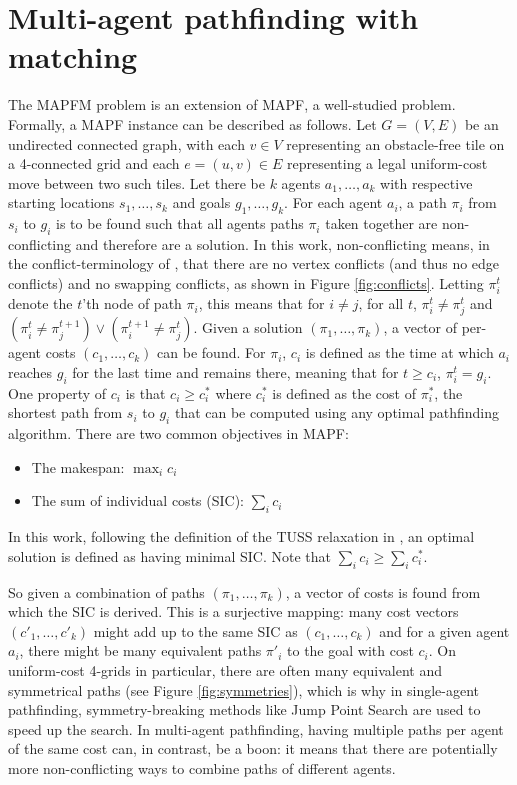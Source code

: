\documentclass[english]{article}
\begin{document}
	\section{Multi-agent pathfinding with matching} %
	The MAPFM problem is an extension of MAPF, a well-studied problem. Formally, a MAPF instance can be described as follows. Let $G = (V,E)$ be an undirected connected graph, with each $v\in V$ representing an obstacle-free tile on a 4-connected grid and each $e = (u,v)\in E$ representing a legal uniform-cost move between two such tiles. Let there be $k$ agents $a_1,\ldots,a_k$ with respective starting locations $s_1,\ldots,s_k$ and goals $g_1,\ldots,g_k$. For each agent $a_i$, a path $\pi_i$ from $s_i$ to $g_i$ is to be found such that all agents paths $\pi_i$ taken together are non-conflicting and therefore are a solution. In this work, non-conflicting means, in the conflict-terminology of \cite{stern2019}, that there are no vertex conflicts (and thus no edge conflicts) and no swapping conflicts, as shown in Figure \ref{fig:conflicts}. Letting $\pi_i^t$ denote the $t$'th node of path $\pi_i$, this means that for $i\neq j$, for all $t$, $\pi_i^t\neq \pi_j^t$ and $(\pi_i^t \neq \pi_j^{t + 1})\lor(\pi_i^{t+1} \neq \pi_j^t)$. Given a solution $(\pi_1,\ldots,\pi_k)$, a vector of per-agent costs $(c_1,\ldots,c_k)$ can be found. For $\pi_i$, $c_i$ is defined as the time at which $a_i$ reaches $g_i$ for the last time and remains there, meaning that for $t \geq c_i$, $\pi_i^{t} = g_i$. One property of $c_i$ is that $c_i \geq c^*_i$ where $c^*_i$ is defined as the cost of $\pi^*_i$, the shortest path from $s_i$ to $g_i$ that can be computed using any optimal pathfinding algorithm. There are two common objectives in MAPF:
	\begin{itemize}
		\item The makespan: $\max_{i} c_i$
		\item The sum of individual costs (SIC): $\sum_i c_i$
	\end{itemize}
	In this work, following the definition of the TUSS relaxation in \cite{mulderij2020}, an optimal solution is defined as having minimal SIC. Note that $\sum_i c_i \geq \sum_i c^*_i$.
	
	So given a combination of paths $(\pi_1,\ldots,\pi_k)$, a vector of costs is found from which the SIC is derived. This is a surjective mapping: many cost vectors $(c'_1,\ldots,c'_k)$ might add up to the same SIC as $(c_1,\ldots,c_k)$ and for a given agent $a_i$, there might be many equivalent paths $\pi'_i$ to the goal with cost $c_i$. On uniform-cost 4-grids in particular, there are often many equivalent and symmetrical paths\cite{harabor2010} (see Figure \ref{fig:symmetries}), which is why in single-agent pathfinding, symmetry-breaking methods like Jump Point Search\cite{harabor2011} are used to speed up the search. In multi-agent pathfinding, having multiple paths per agent of the same cost can, in contrast, be a boon: it means that there are potentially more non-conflicting ways to combine paths of different agents.
\end{document}
